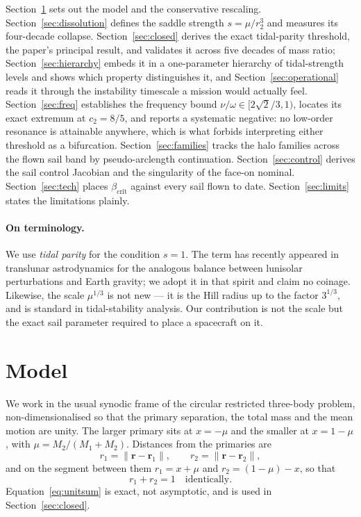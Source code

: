 \documentclass[11pt,a4paper]{article}
\begin{document}
Section~\ref{sec:model} sets out the model and the conservative rescaling.
Section~\ref{sec:dissolution} defines the saddle strength $s=\mu/r_2^3$ and
measures its four-decade collapse. Section~\ref{sec:closed} derives the exact
tidal-parity threshold, the paper's principal result, and validates it across
five decades of mass ratio; Section~\ref{sec:hierarchy} embeds it in a
one-parameter hierarchy of tidal-strength levels and shows which property
distinguishes it, and Section~\ref{sec:operational} reads it through the
instability timescale a mission would actually feel. Section~\ref{sec:freq} establishes the frequency
bound $\nu/\omega\in[2\sqrt2/3,1)$, locates its exact extremum at $c_2=8/5$, and
reports a systematic negative: no low-order resonance is attainable anywhere,
which is what forbids interpreting either threshold as a bifurcation.
Section~\ref{sec:families} tracks the halo families across the flown sail band
by pseudo-arclength continuation. Section~\ref{sec:control} derives the sail
control Jacobian and the singularity of the face-on nominal.
Section~\ref{sec:tech} places $\beta_{\mathrm{crit}}$ against every sail flown
to date. Section~\ref{sec:limits} states the limitations plainly.

\paragraph{On terminology.}
We use \emph{tidal parity} for the condition $s=1$. The term has recently
appeared in translunar astrodynamics for the analogous balance between
lunisolar perturbations and Earth gravity; we adopt it in that spirit and claim
no coinage. Likewise, the scale $\mu^{1/3}$ is not new --- it is the Hill radius
up to the factor $3^{1/3}$, and is standard in tidal-stability analysis. Our
contribution is not the scale but the exact sail parameter required to place a
spacecraft on it.

\section{Model}\label{sec:model}

We work in the usual synodic frame of the circular restricted three-body
problem, non-dimensionalised so that the primary separation, the total mass and
the mean motion are unity. The larger primary sits at $x=-\mu$ and the smaller
at $x=1-\mu$, with $\mu=M_2/(M_1+M_2)$. Distances from the primaries are
\begin{equation}
  r_1 = \lVert\bm{r}-\bm{r}_1\rVert, \qquad
  r_2 = \lVert\bm{r}-\bm{r}_2\rVert ,
\end{equation}
and on the segment between them $r_1=x+\mu$ and $r_2=(1-\mu)-x$, so that
\begin{equation}
  r_1 + r_2 = 1 \quad\text{identically.}
  \label{eq:unitsum}
\end{equation}
Equation~\eqref{eq:unitsum} is exact, not asymptotic, and is used in
Section~\ref{sec:closed}.
\end{document}
